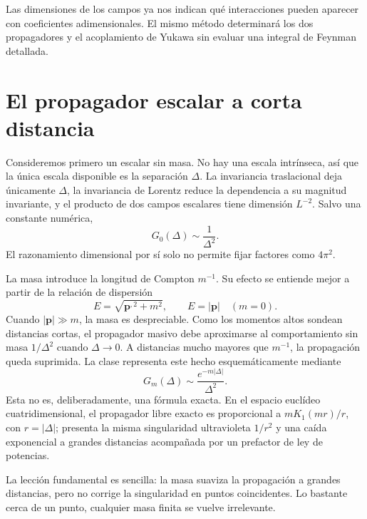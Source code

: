 Las dimensiones de los campos ya nos indican qué interacciones pueden aparecer con coeficientes adimensionales. El mismo método determinará los dos propagadores y el acoplamiento de Yukawa sin evaluar una integral de Feynman detallada.

\section{El propagador escalar a corta distancia}

Consideremos primero un escalar sin masa. No hay una escala intrínseca, así que la única escala disponible es la separación \(\Delta\). La invariancia traslacional deja únicamente \(\Delta\), la invariancia de Lorentz reduce la dependencia a su magnitud invariante, y el producto de dos campos escalares tiene dimensión \(L^{-2}\). Salvo una constante numérica,
\begin{equation}
G_0(\Delta)\sim\frac{1}{\Delta^2}.
\end{equation}
El razonamiento dimensional por sí solo no permite fijar factores como \(4\pi^2\).

La masa introduce la longitud de Compton \(m^{-1}\). Su efecto se entiende mejor a partir de la relación de dispersión
\begin{equation}
E=\sqrt{\bm p^{,2}+m^2},
\qquad
E=|\bm p|\quad(m=0).
\end{equation}
Cuando \(|\bm p|\gg m\), la masa es despreciable. Como los momentos altos sondean distancias cortas, el propagador masivo debe aproximarse al comportamiento sin masa \(1/\Delta^2\) cuando \(\Delta\to0\). A distancias mucho mayores que \(m^{-1}\), la propagación queda suprimida. La clase representa este hecho esquemáticamente mediante
\begin{equation}
G_m(\Delta)\sim \frac{e^{-m|\Delta|}}{\Delta^2}.
\end{equation}
Esta no es, deliberadamente, una fórmula exacta. En el espacio euclídeo cuatridimensional, el propagador libre exacto es proporcional a \(mK_1(mr)/r\), con \(r=|\Delta|\); presenta la misma singularidad ultravioleta \(1/r^2\) y una caída exponencial a grandes distancias acompañada por un prefactor de ley de potencias.

La lección fundamental es sencilla: la masa suaviza la propagación a grandes distancias, pero no corrige la singularidad en puntos coincidentes. Lo bastante cerca de un punto, cualquier masa finita se vuelve irrelevante.

